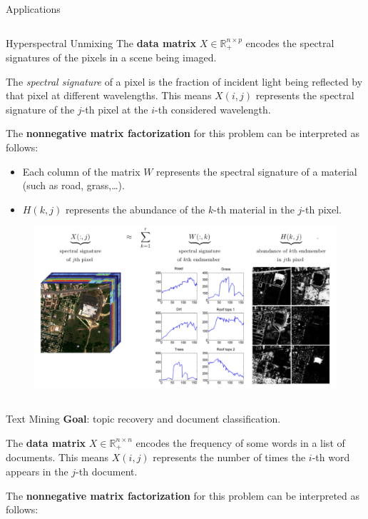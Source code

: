 \documentclass[final]{beamer}
\newlength{\onecolwid}
\newlength{\threecolwid}
\newcommand{\real}{\mathbb{R}}
\begin{document}
\begin{frame}
\begin{columns}[t]
\begin{column}{\threecolwid}
\begin{exampleblock}{Applications}
\begin{columns}[t]
\begin{column}{\onecolwid}
\begin{block}{Hyperspectral Unmixing}
The \textbf{data matrix} $X\in\real^{n\times p}_+$ encodes the spectral signatures of the pixels in a scene being imaged.

The \textit{spectral signature} of a pixel is the fraction of incident light being reflected by that pixel at different wavelengths.
This means \(X(i, j)\) represents the spectral signature of the $j$-th pixel at the $i$-th considered wavelength.

The \textbf{nonnegative matrix factorization} for this problem can be interpreted as follows:

\begin{itemize}
    \item Each column of the matrix $W$ represents the spectral signature of a material (such as road, grass,\dots).
    \item $H(k, j)$ represents the abundance of the $k$-th material in the $j$-th pixel.
\end{itemize}
\begin{figure}
    \centering
    \includegraphics[width=0.8\linewidth]{../images/NMF_app3.png}
\end{figure}
\end{block}
\end{column}
\end{columns}
\begin{block}{Text Mining}
\textbf{Goal}: topic recovery and document classification.

The \textbf{data matrix} $X\in\real^{n\times n}_+$ encodes the frequency of some words in a list of documents.
This means $X(i, j)$ represents the number of times the $i$-th word appears in the $j$-th document.

The \textbf{nonnegative matrix factorization} for this problem can be interpreted as follows:


\end{block}
\end{exampleblock}
\end{column}
\end{columns}
\end{frame}
\end{document}
